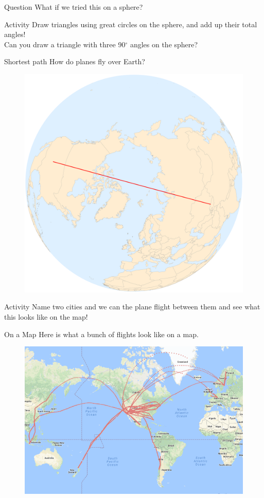 \documentclass[UKenglish]{beamer}
\begin{document}
\begin{frame}{Question}
    What if we tried this on a sphere?
\end{frame}


\begin{frame}{Activity}
    Draw triangles using great circles on the sphere, and add up their total angles!\\
    \vspace*{2cm}
    Can you draw a triangle with three 90$^\circ$ angles on the sphere?
\end{frame}



\begin{frame}{Shortest path}
How do planes fly over Earth?
\pause
        \begin{figure}[H]
        \centering
        \includegraphics[width=.6\textwidth]{Figures/earth_two_cities.pdf}
    \end{figure}
\end{frame}

\begin{frame}{Activity}
    Name two cities and we can the plane flight between them and see what this looks like on the map!
\end{frame}

\begin{frame}{On a Map}
Here is what a bunch of flights look like on a map.
    \begin{figure}
        \centering
        \includegraphics[width=.8\textwidth]{UiB-images/flightpaths.png}
    \end{figure}
\end{frame}
\end{document}
